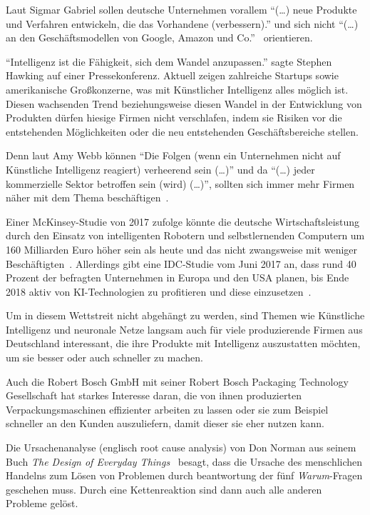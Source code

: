 Laut Sigmar Gabriel sollen deutsche Unternehmen vorallem \enquote{(\ldots) neue Produkte und Verfahren entwickeln, die
das Vorhandene (verbessern).} und sich nicht \enquote{(\ldots) an den Geschäftsmodellen von Google, Amazon und
Co.}~\cite{article_einleitung_ww_sg} orientieren.

\enquote{Intelligenz ist die Fähigkeit, sich dem Wandel anzupassen.} sagte Stephen Hawking auf einer Pressekonferenz.
Aktuell zeigen zahlreiche Startups sowie amerikanische Großkonzerne, was mit Künstlicher Intelligenz alles möglich ist.
Diesen wachsenden Trend beziehungsweise diesen Wandel in der Entwicklung von Produkten dürfen hiesige Firmen nicht
verschlafen, indem sie Risiken vor die entstehenden Möglichkeiten oder die neu entstehenden Geschäftsbereiche stellen.

Denn laut Amy Webb können \enquote{Die Folgen (wenn ein Unternehmen nicht auf Künstliche Intelligenz reagiert)
verheerend sein (\ldots)} und da \enquote{(\ldots) jeder kommerzielle Sektor betroffen sein (wird) (\ldots)}, sollten
sich immer mehr Firmen näher mit dem Thema beschäftigen~\cite{article_einleitung_dub_aw}.

Einer McKinsey-Studie von 2017 zufolge könnte die deutsche Wirtschaftsleistung durch den Einsatz von intelligenten
Robotern und selbstlernenden Computern um 160 Milliarden Euro höher sein als heute und das nicht zwangsweise mit weniger
Beschäftigten~\cite{online_einleitung_mckinsey}. Allerdings gibt eine IDC-Studie vom Juni 2017 an, dass rund 40 Prozent
der befragten Unternehmen in Europa und den USA planen, bis Ende 2018 aktiv von KI-Technologien zu profitieren und diese
einzusetzen~\cite{article_grundlagen_salesforce}.

Um in diesem Wettstreit nicht abgehängt zu werden, sind Themen wie Künstliche Intelligenz und neuronale Netze langsam
auch für viele produzierende Firmen aus Deutschland interessant, die ihre Produkte mit Intelligenz auszustatten möchten,
um sie besser oder auch schneller zu machen.

Auch die Robert Bosch GmbH mit seiner Robert Bosch Packaging Technology Gesellschaft hat starkes Interesse daran, die
von ihnen produzierten Verpackungsmaschinen effizienter arbeiten zu lassen oder sie zum Beispiel schneller an den Kunden
auszuliefern, damit dieser sie eher nutzen kann.

Die Ursachenanalyse (englisch root cause analysis) von Don Norman aus seinem Buch \textit{The Design of Everyday
Things}~\cite{book_einleitung_donnorman} besagt, dass die Ursache des menschlichen Handelns zum Lösen von Problemen
durch beantwortung der fünf \textit{Warum}-Fragen geschehen muss. Durch eine Kettenreaktion sind dann auch alle anderen
Probleme gelöst.

